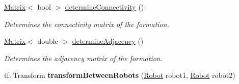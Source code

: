 \begin{DoxyCompactItemize}
\hyperlink{classFormation_a227cd099c5171dd7a8f66cf010793e4e}{Matrix}$<$ bool $>$ \hyperlink{classFormation_a9ce3e6dbf7316f44796db86eb65e328c}{determine\+Connectivity} ()
\begin{DoxyCompactList}\small\item\em Determines the connectivity matrix of the formation. \end{DoxyCompactList}\item 
\hyperlink{classFormation_a227cd099c5171dd7a8f66cf010793e4e}{Matrix}$<$ double $>$ \hyperlink{classFormation_a0d72674a06fab2a9e262bdb89d75e294}{determine\+Adjacency} ()
\begin{DoxyCompactList}\small\item\em Determines the adjacency matrix of the formation. \end{DoxyCompactList}\item 
tf\+::\+Transform {\bfseries transform\+Between\+Robots} (\hyperlink{structFormation_1_1Robot}{Robot} robot1, \hyperlink{structFormation_1_1Robot}{Robot} robot2)\hypertarget{classFormation_a63efd039220b02244325b6d9bce84217}{}\label{classFormation_a63efd039220b02244325b6d9bce84217}

\end{DoxyCompactItemize}
